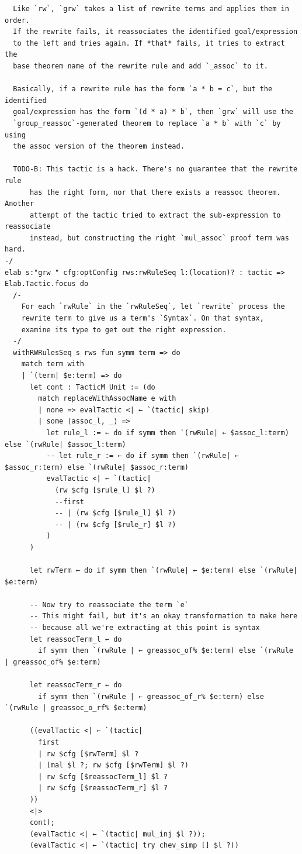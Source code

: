 \documentclass[10pt,a4paper]{article}
\begin{document}
\begin{Verbatim}
  Like `rw`, `grw` takes a list of rewrite terms and applies them in order.
  If the rewrite fails, it reassociates the identified goal/expression
  to the left and tries again. If *that* fails, it tries to extract the
  base theorem name of the rewrite rule and add `_assoc` to it.

  Basically, if a rewrite rule has the form `a * b = c`, but the identified
  goal/expression has the form `(d * a) * b`, then `grw` will use the
  `group_reassoc`-generated theorem to replace `a * b` with `c` by using
  the assoc version of the theorem instead.

  TODO-B: This tactic is a hack. There's no guarantee that the rewrite rule
      has the right form, nor that there exists a reassoc theorem. Another
      attempt of the tactic tried to extract the sub-expression to reassociate
      instead, but constructing the right `mul_assoc` proof term was hard.
-/
elab s:"grw " cfg:optConfig rws:rwRuleSeq l:(location)? : tactic => Elab.Tactic.focus do
  /-
    For each `rwRule` in the `rwRuleSeq`, let `rewrite` process the
    rewrite term to give us a term's `Syntax`. On that syntax,
    examine its type to get out the right expression.
  -/
  withRWRulesSeq s rws fun symm term => do
    match term with
    | `(term| $e:term) => do
      let cont : TacticM Unit := (do
        match replaceWithAssocName e with
        | none => evalTactic <| ← `(tactic| skip)
        | some ⟨assoc_l, _⟩ =>
          let rule_l := ← do if symm then `(rwRule| ← $assoc_l:term) else `(rwRule| $assoc_l:term)
          -- let rule_r := ← do if symm then `(rwRule| ← $assoc_r:term) else `(rwRule| $assoc_r:term)
          evalTactic <| ← `(tactic|
            (rw $cfg [$rule_l] $l ?)
            --first
            -- | (rw $cfg [$rule_l] $l ?)
            -- | (rw $cfg [$rule_r] $l ?)
          )
      )

      let rwTerm ← do if symm then `(rwRule| ← $e:term) else `(rwRule| $e:term)

      -- Now try to reassociate the term `e`
      -- This might fail, but it's an okay transformation to make here
      -- because all we're extracting at this point is syntax
      let reassocTerm_l ← do
        if symm then `(rwRule | ← greassoc_of% $e:term) else `(rwRule | greassoc_of% $e:term)

      let reassocTerm_r ← do
        if symm then `(rwRule | ← greassoc_of_r% $e:term) else `(rwRule | greassoc_o_rf% $e:term)

      ((evalTactic <| ← `(tactic|
        first
        | rw $cfg [$rwTerm] $l ?
        | (mal $l ?; rw $cfg [$rwTerm] $l ?)
        | rw $cfg [$reassocTerm_l] $l ?
        | rw $cfg [$reassocTerm_r] $l ?
      ))
      <|>
      cont);
      (evalTactic <| ← `(tactic| mul_inj $l ?));
      (evalTactic <| ← `(tactic| try chev_simp [] $l ?))


\end{Verbatim}
\end{document}
